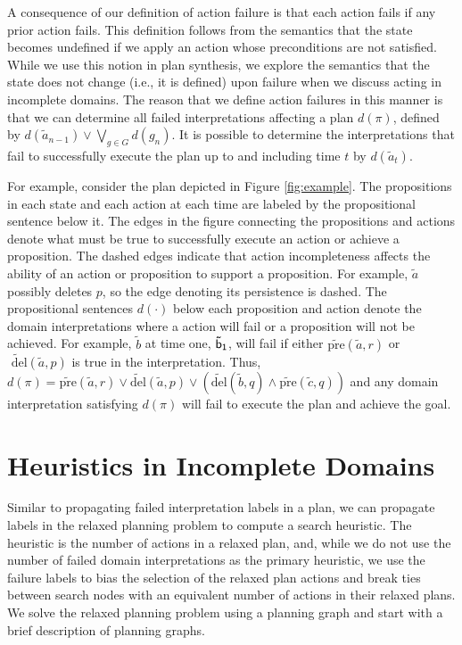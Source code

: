 \documentclass[letterpaper]{article}
\begin{document}
A consequence of our definition of action failure is that each action fails if
any prior action fails.  This definition follows from the semantics that the
state becomes undefined if we apply an action whose preconditions are not
satisfied.  While we use this notion in plan synthesis, we explore the semantics
that the state does not change (i.e., it is defined) upon failure when we
discuss acting in incomplete domains.  The reason that we define action failures
in this manner is that we can determine all failed interpretations affecting a
plan $d(\pi)$, defined  by  $d(\tilde{a}_{n-1}) \vee \bigvee_{g \in G} d(g_n)$.
It is possible to determine the interpretations that fail to successfully
execute the plan up to and including time $t$ by  $d(\tilde{a}_t)$.

For example, consider the plan depicted in Figure \ref{fig:example}.  The
propositions in each state and each action at each time are labeled by the
propositional sentence below it. The edges in the figure connecting the
propositions and actions denote what must be true to successfully execute an
action or achieve a proposition.  The dashed edges indicate that action
incompleteness affects the ability of an action or proposition to support a
proposition.  For example, $\tilde{a}$ possibly deletes $p$, so the edge
denoting its persistence is dashed.  The propositional sentences  $d(\cdot)$
below each proposition and action denote the domain interpretations where a
action will fail or a proposition will not be achieved.  For example,
$\tilde{b}$ at time one, ${\sf \tilde{b}_1}$, will fail if either
$\widetilde{\text{pre}}(\tilde{a}, r)$ or $\widetilde{\text{ del}}(\tilde{a},
p)$ is true in the interpretation.  Thus, $d(\pi) =
\widetilde{\text{pre}}(\tilde{a}, r) \vee \widetilde{\text{del}}(\tilde{a},
p)\vee (\widetilde{\text{del}}(\tilde{b}, q) \wedge
\widetilde{\text{pre}}(\tilde{c}, q))$ and any domain interpretation satisfying
$d(\pi)$ will fail to execute the plan and achieve the goal.




\section{Heuristics in Incomplete Domains}

Similar to propagating failed interpretation labels in a plan, we can propagate
labels in the relaxed planning problem to compute a search heuristic.  The
heuristic is the number of actions in a relaxed plan, and, while we do not use
the number of failed domain interpretations as the primary heuristic, we use the
failure labels to bias the selection of the relaxed plan actions and break ties
between search nodes with an equivalent number of actions in their relaxed
plans.  We solve the relaxed planning problem using a planning graph and 
start with a brief description of planning graphs.
\end{document}
